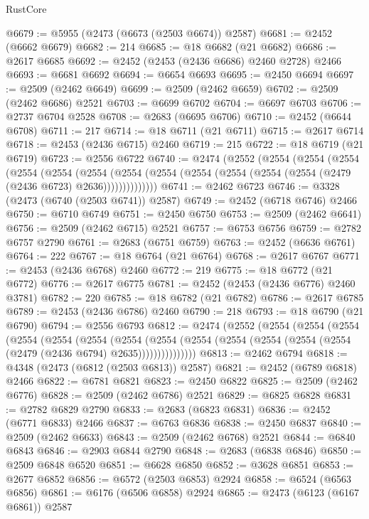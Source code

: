 \begin{lexlean}{RustCore}
\begin{coremodule}
@6679 := @5955 (@2473 (@6673 (@2503 @6674)) @2587)
@6681 := @2452 (@6662 @6679)
@6682 := 214
@6685 := @18 @6682 (@21 @6682)
@6686 := @2617 @6685
@6692 := @2452 (@2453 (@2436 @6686) @2460 @2728) @2466
@6693 := @6681 @6692
@6694 := @6654 @6693
@6695 := @2450 @6694
@6697 := @2509 (@2462 @6649)
@6699 := @2509 (@2462 @6659)
@6702 := @2509 (@2462 @6686) @2521
@6703 := @6699 @6702
@6704 := @6697 @6703
@6706 := @2737 @6704 @2528
@6708 := @2683 (@6695 @6706)
@6710 := @2452 (@6644 @6708)
@6711 := 217
@6714 := @18 @6711 (@21 @6711)
@6715 := @2617 @6714
@6718 := @2453 (@2436 @6715) @2460
@6719 := 215
@6722 := @18 @6719 (@21 @6719)
@6723 := @2556 @6722
@6740 := @2474
    (@2552
      (@2554
        (@2554
          (@2554
            (@2554
              (@2554
                (@2554
                  (@2554 (@2554 (@2554 (@2554 (@2554 (@2554 (@2479 (@2436 @6723) @2636))))))))))))))
@6741 := @2462 @6723
@6746 := @3328 (@2473 (@6740 (@2503 @6741)) @2587)
@6749 := @2452 (@6718 @6746) @2466
@6750 := @6710 @6749
@6751 := @2450 @6750
@6753 := @2509 (@2462 @6641)
@6756 := @2509 (@2462 @6715) @2521
@6757 := @6753 @6756
@6759 := @2782 @6757 @2790
@6761 := @2683 (@6751 @6759)
@6763 := @2452 (@6636 @6761)
@6764 := 222
@6767 := @18 @6764 (@21 @6764)
@6768 := @2617 @6767
@6771 := @2453 (@2436 @6768) @2460
@6772 := 219
@6775 := @18 @6772 (@21 @6772)
@6776 := @2617 @6775
@6781 := @2452 (@2453 (@2436 @6776) @2460 @3781)
@6782 := 220
@6785 := @18 @6782 (@21 @6782)
@6786 := @2617 @6785
@6789 := @2453 (@2436 @6786) @2460
@6790 := 218
@6793 := @18 @6790 (@21 @6790)
@6794 := @2556 @6793
@6812 := @2474
    (@2552
      (@2554
        (@2554
          (@2554
            (@2554
              (@2554
                (@2554
                  (@2554
                    (@2554
                      (@2554 (@2554 (@2554 (@2554 (@2554 (@2479 (@2436 @6794) @2635)))))))))))))))
@6813 := @2462 @6794
@6818 := @4348 (@2473 (@6812 (@2503 @6813)) @2587)
@6821 := @2452 (@6789 @6818) @2466
@6822 := @6781 @6821
@6823 := @2450 @6822
@6825 := @2509 (@2462 @6776)
@6828 := @2509 (@2462 @6786) @2521
@6829 := @6825 @6828
@6831 := @2782 @6829 @2790
@6833 := @2683 (@6823 @6831)
@6836 := @2452 (@6771 @6833) @2466
@6837 := @6763 @6836
@6838 := @2450 @6837
@6840 := @2509 (@2462 @6633)
@6843 := @2509 (@2462 @6768) @2521
@6844 := @6840 @6843
@6846 := @2903 @6844 @2790
@6848 := @2683 (@6838 @6846)
@6850 := @2509 @6848 @6520
@6851 := @6628 @6850
@6852 := @3628 @6851
@6853 := @2677 @6852
@6856 := @6572 (@2503 @6853) @2924
@6858 := @6524 (@6563 @6856)
@6861 := @6176 (@6506 @6858) @2924
@6865 := @2473 (@6123 (@6167 @6861)) @2587

\end{coremodule}
\end{lexlean}
